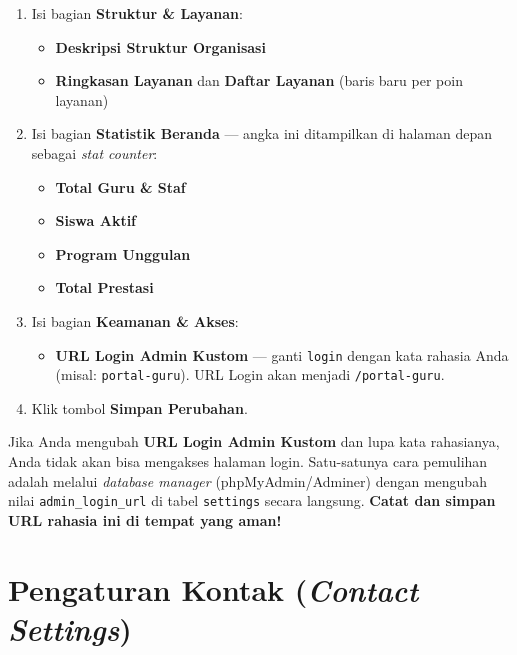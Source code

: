 \begin{enumerate}
  \item Isi bagian \textbf{Struktur \& Layanan}:
        \begin{itemize}
          \item \textbf{Deskripsi Struktur Organisasi}
          \item \textbf{Ringkasan Layanan} dan \textbf{Daftar Layanan}
                (baris baru per poin layanan)
        \end{itemize}
  \item Isi bagian \textbf{Statistik Beranda} --- angka ini ditampilkan di
        halaman depan sebagai \textit{stat counter}:
        \begin{itemize}
          \item \textbf{Total Guru \& Staf}
          \item \textbf{Siswa Aktif}
          \item \textbf{Program Unggulan}
          \item \textbf{Total Prestasi}
        \end{itemize}
  \item Isi bagian \textbf{Keamanan \& Akses}:
        \begin{itemize}
          \item \textbf{URL Login Admin Kustom} --- ganti \texttt{login} dengan
                kata rahasia Anda (misal: \texttt{portal-guru}).
                URL Login akan menjadi \texttt{/portal-guru}.
        \end{itemize}
  \item Klik tombol \textbf{Simpan Perubahan}.
\end{enumerate}

\begin{warnbox}
  Jika Anda mengubah \textbf{URL Login Admin Kustom} dan lupa kata rahasianya,
  Anda tidak akan bisa mengakses halaman login. Satu-satunya cara pemulihan adalah
  melalui \textit{database manager} (phpMyAdmin/Adminer) dengan mengubah nilai
  \texttt{admin\_login\_url} di tabel \texttt{settings} secara langsung.
  \textbf{Catat dan simpan URL rahasia ini di tempat yang aman!}
\end{warnbox}

\section{Pengaturan Kontak (\textit{Contact Settings})}

